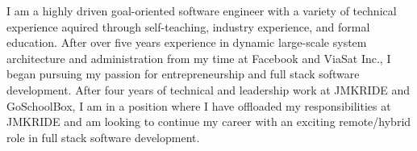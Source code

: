 

\begin{cvparagraph}

I am a highly driven goal-oriented software engineer with a variety of technical
experience aquired through self-teaching, industry experience, and formal education.
After over five years experience in dynamic large-scale system architecture and
administration from my time at Facebook and ViaSat Inc., I began pursuing my
passion for entrepreneurship and full stack software development. After four
years of technical and leadership work at JMKRIDE and GoSchoolBox, I am in a
position where I have offloaded my responsibilities at JMKRIDE and am looking to
continue my career with an exciting remote/hybrid role in full stack software
development.
\end{cvparagraph}
